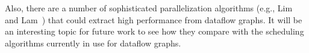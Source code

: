 Also, there are a number of sophisticated parallelization algorithms
(e.g., Lim and Lam~\cite{Lim01}) that could extract high performance
from dataflow graphs.  It will be an interesting topic for future work
to see how they compare with the scheduling algorithms currently in
use for dataflow graphs.







